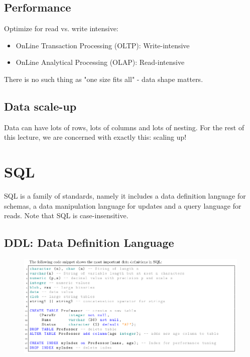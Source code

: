 \documentclass[11pt,oneside,a4paper]{article}
\begin{document}
\subsection{Performance}

Optimize for read vs. write intensive:
\vspace{-\topsep}
\begin{itemize}
	\setlength{\itemsep}{0pt}
	\setlength{\parskip}{0pt}
	\item OnLine Transaction Processing	(OLTP):	Write-intensive
	\item OnLine Analytical Processing (OLAP): Read-intensive
\end{itemize}

There is no such thing as "one size fits all" - data shape matters.

\subsection{Data scale-up}

Data can have lots of rows, lots of columns and lots of nesting. For the rest of this lecture, we are concerned with exactly this: scaling up!

\newpage

\titlespacing{\subsection}{0pt}{0ex}{0ex}

\section{SQL}

SQL is a family of standards, namely it includes a data definition language for schemas, a data manipulation language for updates and a query language for reads. Note that SQL is case-insensitive.

\subsection{DDL: Data Definition Language}
\vspace{-\topsep}
\begin{figure}[hb!]
	\centering
	\includegraphics[width=1\linewidth]{figures/sql_1}
	\label{fig:sql1}
\end{figure}
\vspace{-\topsep}
\end{document}
